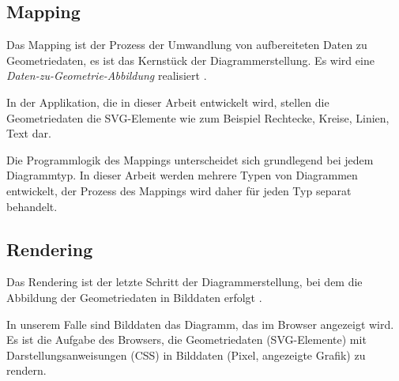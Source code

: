 \subsection{Mapping}

Das Mapping ist der Prozess der Umwandlung von aufbereiteten Daten zu Geometriedaten, es ist das Kernstück der Diagrammerstellung. Es wird eine \textit{Daten-zu-Geometrie-Abbildung} realisiert \cite{viz}.

In der Applikation, die in dieser Arbeit entwickelt wird, stellen die Geometriedaten die SVG-Elemente wie zum Beispiel Rechtecke, Kreise, Linien, Text dar.

Die Programmlogik des Mappings unterscheidet sich grundlegend bei jedem Diagrammtyp. In dieser Arbeit werden mehrere Typen von Diagrammen entwickelt, der Prozess des Mappings wird daher für jeden Typ separat behandelt.

\subsection{Rendering}


Das Rendering ist der letzte Schritt der Diagrammerstellung, bei dem die Abbildung der Geometriedaten in Bilddaten erfolgt \cite{viz}.

In unserem Falle sind Bilddaten das Diagramm, das im Browser angezeigt wird. Es ist die Aufgabe des Browsers, die Geometriedaten (SVG-Elemente) mit Darstellungsanweisungen (CSS) in Bilddaten (Pixel, angezeigte Grafik) zu rendern.
